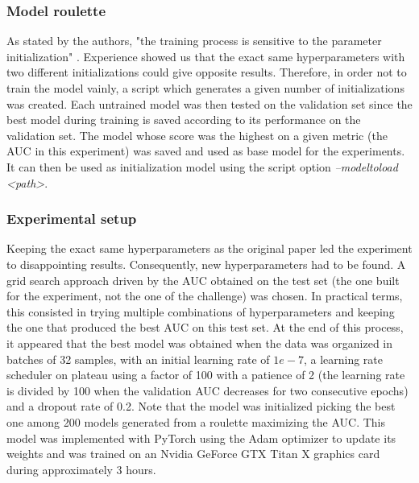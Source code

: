 \subsubsection{Model roulette}
\setlength{\marginparwidth}{3cm}\leavevmode {}As stated by the authors, "the training process is sensitive to the parameter initialization" \cite{07}. Experience showed us that the exact same hyperparameters with two different initializations could give opposite results. Therefore, in order not to train the model vainly, a script which generates a given number of initializations was created. Each untrained model was then tested on the validation set since the best model during training is saved according to its performance on the validation set. The model whose score was the highest on a given metric (the AUC in this experiment) was saved and used as base model for the experiments. It can then be used as initialization model using the script option \textit{--modeltoload <path>}.



\subsubsection{Experimental setup}

\setlength{\marginparwidth}{3cm}\leavevmode {}
Keeping the exact same hyperparameters as the original paper led the experiment to disappointing results. Consequently, new hyperparameters had to be found. A grid search approach driven by the AUC obtained on the test set (the one built for the experiment, not the one of the challenge) was chosen. In practical terms, this consisted in trying multiple combinations of hyperparameters and keeping the one that produced the best AUC on this test set. At the end of this process, it appeared that the best model was obtained when the data was organized in batches of 32 samples, with an initial learning rate of $1e-7$, a learning rate scheduler on plateau using a factor of 100 with a patience of 2 (the learning rate is divided by 100 when the validation AUC decreases for two consecutive epochs) and a dropout rate of 0.2. Note that the model was initialized picking the best one among 200 models generated from a roulette maximizing the AUC. This model was implemented with PyTorch using the Adam optimizer to update its weights and was trained on an Nvidia GeForce GTX Titan X graphics card during approximately 3 hours.\\

